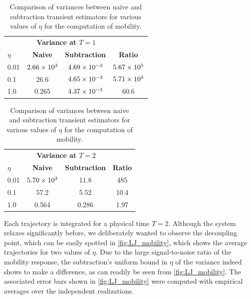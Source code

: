 %
\begin{table}[h!]
\begin{subtable}[h]{0.45\textwidth}
\centering
\begin{tabular}{lccc}
\toprule
 & \multicolumn{2}{c}{\textbf{Variance at $T=1$}} &  \\
\cmidrule(lr){2-3}
 $\eta$ & \textbf{Naive} & \textbf{Subtraction} & \textbf{Ratio} \\
\midrule
0.01 & ${2.66}\times 10^{3}$ & ${4.69}\times 10^{-3}$ & ${5.67}\times 10^{5}$ \\
0.1  & 26.6   & ${4.65}\times 10^{-3}$ & ${5.71}\times 10^{3}$  \\
1.0  & 0.265    & ${4.37}\times 10^{-3}$ & 60.6    \\
\bottomrule
\end{tabular}
\caption{Data at $T=1$ (start of decoupling)}
\end{subtable}%
\hfill
\begin{subtable}[h]{0.45\textwidth}
\centering
\begin{tabular}{lccc}
\toprule
 & \multicolumn{2}{c}{\textbf{Variance at $T=2$}} &  \\
\cmidrule(lr){2-3}
 $\eta$ & \textbf{Naive} & \textbf{Subtraction} & \textbf{Ratio} \\
\midrule
0.01 & ${5.70}\times 10^{3}$ & 11.8 & 485 \\
0.1  & 57.2   & 5.52  & 10.4  \\
1.0  & 0.564    & 0.286  & 1.97   \\
\bottomrule
\end{tabular}
\caption{Data at final time $T=2$ (total decoupling)}
\end{subtable}
\caption{Comparison of variances between naive and subtraction transient estimators for various values of $\eta$ for the computation of mobility.}
\label{table:LJ_mobility}
\end{table}
%
Each trajectory is integrated for a physical time $T=2$. Although the system relaxes significantly before, we deliberately wanted to observe the decoupling point, which can be easily spotted in \cref{fig:LJ_mobility}, which shows the average trajectories for two values of $\eta$. Due to the large signal-to-noise ratio of the mobility response, the subtraction's uniform bound in $\eta$ of the variance indeed shows to make a difference, as can readily be seen from \cref{fig:LJ_mobility}. The associated error bars shown in \cref{fig:LJ_mobility} were computed with empirical averages over the independent realizations.

